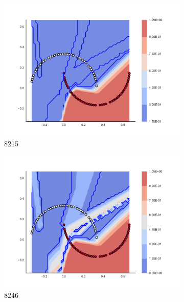 \begin{figure}[h]
\begin{subfigure}[b]{0.09\textwidth}
    \includegraphics[clip, trim=2.35cm 1.75cm 4.5cm 0cm,width=\textwidth]{img/convergence/8215.pdf}
    \caption{8215}
    \label{fig:convergence_8215}
\end{subfigure}
%
\begin{subfigure}[b]{0.09\textwidth}
    \includegraphics[clip, trim=2.35cm 1.75cm 4.5cm 0cm,width=\textwidth]{img/convergence/8246.pdf}
    \caption{8246}
    \label{fig:convergence_8246}
\end{subfigure}
%
\begin{subfigure}[b]{0.09\textwidth}

\end{subfigure}
\end{figure}
